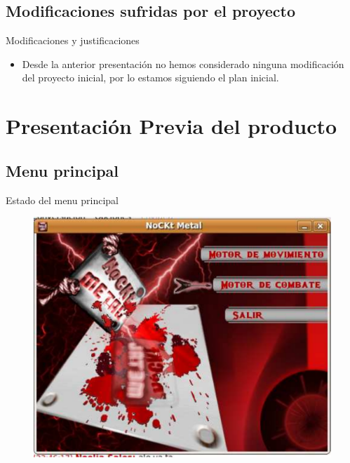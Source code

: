 \documentclass[9pt,xcolor=svgnames]{beamer}
\begin{document}
   
   
   \subsection{Modificaciones sufridas por el proyecto}
   
   \begin{frame}{Modificaciones y justificaciones}
   \transdissolve
    
    \begin{itemize}
     \item Desde la anterior presentación no hemos considerado
	   ninguna modificación del proyecto inicial, por lo
	   estamos siguiendo el plan inicial.
	 
    \end{itemize}    
    
   \end{frame}
   
   
 \section{Presentación Previa del producto}

 \subsection{Menu principal}
 \begin{frame}{Estado del menu principal}
   \transdissolve

   \begin{figure}[t]
    \includegraphics[scale=0.35]{./Imagenes/menu.pdf}
   \end{figure}
 \end{frame}
 
\end{document}
